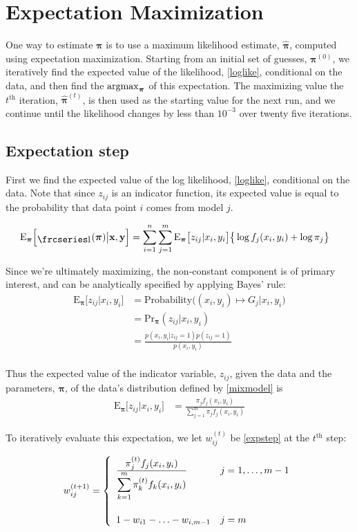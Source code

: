 \documentclass[12pt]{amsart}
\newcommand{\textfrc}[1]{{\frcseries#1}}
\newcommand{\mathfrc}[1]{\raisebox{-0.8mm}{\text{\textfrc{\small #1}}}\hspace{0.4mm}}
\newcommand{\vect}[1]{\boldsymbol{\mathbf{#1}}}
\newcommand{\eqn}[1]{\begin{align*}
#1
\end{align*}}
\newcommand{\eqnl}[2]{\begin{align} \label{#1}
#2
\end{align}}
\newcommand{\bl}{\big\{}
\newcommand{\br}{\big\}}
\newcommand{\argmax}{\operatornamewithlimits{argmax}}
\newcommand{\eqnset}[4]{
\[ #1 = #2 \left\{ \begin{array}{#3}
        #4
\end{array} \right. \] 
}
\newcommand{\vx}{\vect{x}}
\newcommand{\vy}{\vect{y}}
\newcommand{\vp}{\vect{\pi}}
\newcommand{\vph}{\hat{\vect{\pi}}}
\newcommand{\fab}{f_j}
\newcommand{\llp}{\mathfrc{l}(\vect{\pi})}
\newcommand{\sumn}{\sum^n_{i=1}}
\newcommand{\summ}{\sum^m_{j=1}}
\newcommand{\sumk}{\sum^m_{k=1}}
\begin{document}
\section{Expectation Maximization}

One way to estimate $\vp$ is to use a maximum likelihood estimate, $\vph$, computed using expectation maximization. Starting from an initial set of guesses, $\vp^{(0)}$, we iteratively find the expected value of the likelihood, \eqref{loglike}, conditional on the data, and then find the $\argmax_{\vp}$ of this expectation. The maximizing value the $t^\text{th}$ iteration, $\vph^{(t)}$, is then used as the starting value for the next run, and we continue until the likelihood changes by less than $10^{-3}$ over twenty five iterations.

\subsection{Expectation step}
First we find the expected value of the log likelihood, \eqref{loglike}, conditional on the data. Note that since $z_{ij}$ is an indicator function, its expected value is equal to the probability that data point $i$ comes from model $j$.

\eqn{
	\text{E}_{\vp}\Big[\llp \big| \vx,\vy \Big] &= \sumn \summ \text{E}_{\vp}\big[z_{ij}|x_i,y_i\big] \bl \log \fab(x_i,y_i) + \log \pi_j  \br
}

Since we're ultimately maximizing, the non-constant component is of primary interest, and can be analytically specified by applying Bayes' rule:
\eqn{
	\text{E}_{\vp}\Big[  z_{ij} | x_i, y_i \Big] &= \text{Probability}\Big((x_i,y_i) \mapsto G_j \big | x_i,y_i\Big)	\\
	&= \text{Pr}_{\vp}(z_{ij}|x_i,y_i)	\\
	&= \frac{p(x_i,y_i|z_{ij}=1)p(z_{ij}=1)}{p(x_i,y_i)}	\\
}

Thus the expected value of the indicator variable, $z_{ij}$, given the data and the parameters, $\vp$, of the data's distribution defined by \eqref{mixmodel} is
\eqnl{expstep}{
	\text{E}_{\vp}\Big[  z_{ij} | x_i, y_i \Big] &=  \frac{\pi_j \fab(x_i,y_i)  }{\summ \pi_j \fab(x_i,y_i)}
}

To iteratively evaluate this expectation, we let $w^{(t)}_{ij}$ be \eqref{expstep} at the $t^\text{th}$ step:
\eqnset{w^{(t+1)}_{ij}}{}{ll}{
	\frac{\displaystyle\pi^{(t)}_{j} \fab(x_i,y_i)}{\displaystyle\sumk \pi^{(t)}_{k}f_k(x_i,y_i)}				& j=1,\ldots,m-1	\\
	\vspace{1mm} & \\
	1 - w_{i1} - \ldots - w_{i,m-1}		& j=m
}
\end{document}
